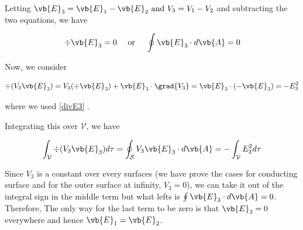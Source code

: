 \documentclass[a4paper,12pt]{report}
\begin{document}
	Letting \(\vb{E} _{3} = \vb{E} _{1} - \vb{E} _{2} \text{ and } V_3 = V_1 - V_2 \) and subtracting the two equations, we have
	
	\begin{equation}
		\div{\vb{E} _{3} } = 0 ~~~ \text { or } ~~~ \oint \vb{E} _{3} \cdot d\vb{A}  = 0 	\label{divE3} 
	\end{equation}
	
	Now, we consider 
	
	\begin{equation}
		\div{(V_3\vb{E} _{3} )} = V_3(\div{\vb{E} _{3} }) + \vb{E} _{3} \cdot \grad{V_3} = \vb{E} _{3} \cdot (-\vb{E} _{3} ) = -E_3^2	  
	\end{equation}
	
	where we used \cref{divE3} . 
	
	
	Integrating this over \(\mathcal{V} \), we have
	
	\begin{equation}
		\int _{\mathcal{V} } \div{(V_3\vb{E} _{3} } ) d\tau  = \oint _{\mathcal{S} } V_3\vb{E} _{3} \cdot d\vb{A}  = -\int _{\mathcal{V} } E_3^2 d\tau 
	\end{equation}
	
	Since \(V_3\) is a constant over every surfaces (we have prove the cases for conducting surface and for the outer surface at infinity, \(V_3 = 0\)), we can take it out of the integral sign in the middle term but what lefts is \(\oint \vb{E} _{3} \cdot d\vb{A}  = 0\). Therefore, The only way for the last term to be zero is that \(\vb{E} _{3} = 0\) everywhere and hence \(\vb{E} _{1} = \vb{E} _{2} \).
	
\end{document}
